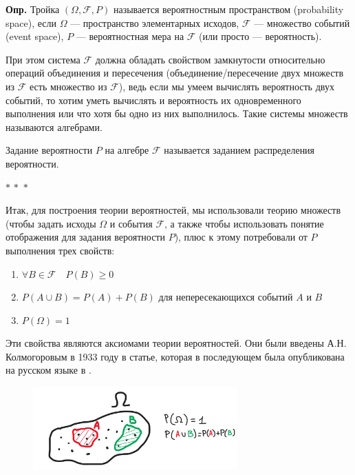 \documentclass[a4paper,12pt]{article}
\renewcommand{\ge}{\geqslant}
\newcommand{\threestars}{\begin{center}$ {\ast}\,{\ast}\,{\ast} $\end{center}}
\newcounter{th-counter}
\newcounter{df-counter}
\newcounter{lm-counter}
\newcommand{\df}{\par\noindent\textbf{Опр.} }
\begin{document}
\df Тройка $(\Omega, \mathcal{F}, P)$ называется вероятностным пространством (probability space), если $\Omega$ --- пространство элементарных исходов, $\mathcal{F}$ --- множество событий (event space), $P$ --- вероятностная мера на $\mathcal{F}$ (или просто --- вероятность).

При этом система $\mathcal{F}$ должна обладать свойством замкнутости относительно операций объединения и пересечения (объединение/пересечение двух множеств из $\mathcal{F}$ есть множество из $\mathcal{F}$), ведь если мы умеем вычислять вероятность двух событий, то хотим уметь вычислять и вероятность их одновременного выполнения или что хотя бы одно из них выполнилось. Такие системы множеств называются алгебрами.

Задание вероятности $P$ на алгебре $\mathcal{F}$ называется заданием распределения вероятности.

\threestars

Итак, для построения теории вероятностей, мы использовали теорию множеств (чтобы задать исходы $\Omega$ и события $\mathcal{F}$, а также чтобы использовать понятие отображения для задания вероятности $P$), плюс к этому потребовали от $P$ выполнения трех свойств:

\begin{enumerate}
    \item $\forall B \in \mathcal{F} \quad P(B) \ge 0$
    \item $P(A \cup B) = P(A)+P(B)$ для непересекающихся событий $A$ и $B$
    \item $P(\Omega) = 1$
\end{enumerate}

Эти свойства являются аксиомами теории вероятностей. Они были введены А.Н. Колмогоровым в 1933 году в статье, которая в последующем была опубликована на русском языке в \cite{Kolmogorov}.

\begin{figure}[h] %
    \centering
    \includegraphics[width=0.7\textwidth]{probability_axioms.png} %
    \label{fig:my_image}
\end{figure}
\end{document}
